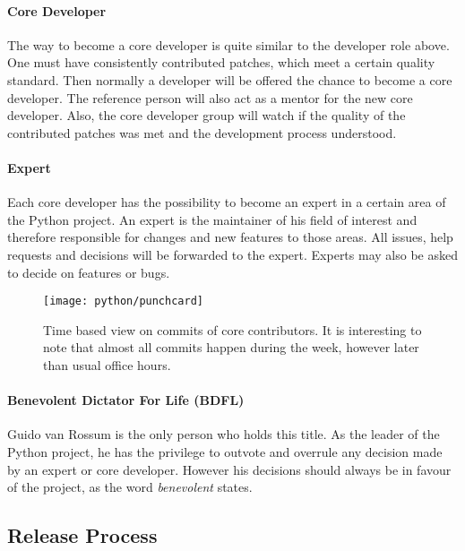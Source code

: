 \paragraph{Core Developer}

The way to become a core developer is quite similar to the developer role
above. One must have consistently contributed patches, which meet a certain
quality standard. Then normally a developer will be offered the chance to
become a core developer. The reference person will also act as a mentor for the
new core developer. Also, the core developer group will watch if the quality of
the contributed patches was met and the development process understood.

\paragraph{Expert}

Each core developer has the possibility to become an expert in a certain area
of the Python project. An expert is the maintainer of his field of interest and
therefore responsible for changes and new features to those areas. All issues,
help requests and decisions will be forwarded to the expert. Experts may also
be asked to decide on features or bugs.

\begin{figure}[hbtp]
  \centering
  \texttt{[image: python/punchcard]}
  \caption[Time Based View on Commits, Python]
  {Time based view on commits of core contributors. It is interesting to note
    that almost all commits happen during the week, however later than usual
    office hours.}
  \label{fig:python:p}
\end{figure}

\paragraph{Benevolent Dictator For Life (BDFL)}

Guido van Rossum is the only person who holds this title. As the leader of the
Python project, he has the privilege to outvote and overrule any decision made
by an expert or core developer. However his decisions should always be in
favour of the project, as the word \emph{benevolent} states.


\subsection{Release Process} %

